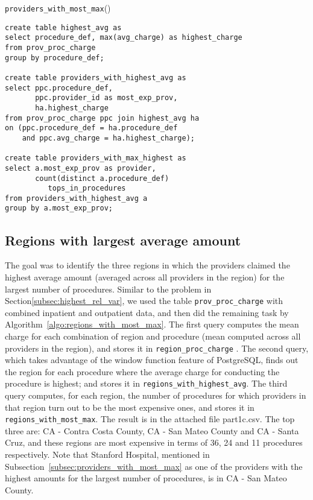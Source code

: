 \begin{algorithm}
\vspace{-2pt}
\caption{{\sf \texttt{providers\_with\_most\_max}}()}
\label{algo:providers_with_most_max}
\begin{verbatim}
create table highest_avg as
select procedure_def, max(avg_charge) as highest_charge
from prov_proc_charge
group by procedure_def;

create table providers_with_highest_avg as
select ppc.procedure_def, 
       ppc.provider_id as most_exp_prov, 
       ha.highest_charge
from prov_proc_charge ppc join highest_avg ha 
on (ppc.procedure_def = ha.procedure_def 
    and ppc.avg_charge = ha.highest_charge);

create table providers_with_max_highest as
select a.most_exp_prov as provider, 
       count(distinct a.procedure_def) 
          tops_in_procedures
from providers_with_highest_avg a
group by a.most_exp_prov;
\end{verbatim}
\end{algorithm}

\subsection{Regions with largest average amount}
\label{subsec:regions_with_most_max}
The goal was to identify the three regions in which the providers claimed the highest average amount (averaged across all providers in the region) for the largest number of procedures. Similar to the problem in Section\ref{subsec:highest_rel_var}, we used the table \texttt{prov\_proc\_charge} with combined inpatient and outpatient data, and then did the remaining task by Algorithm~\ref{algo:regions_with_most_max}. The first query computes the mean charge for each combination of region and procedure (mean computed across all providers in the region), and stores it in \texttt{region\_proc\_charge} . The second query, which takes advantage of the window function feature of PostgreSQL, finds out the region for each procedure where the average charge for conducting the procedure is highest; and stores it in \texttt{regions\_with\_highest\_avg}. The third query computes, for each region, the number of procedures for which providers in that region turn out to be the most expensive ones, and stores it in \texttt{regions\_with\_most\_max}. The result is in the attached file part1c.csv. The top three are: CA - Contra Costa County, CA - San Mateo County and CA - Santa Cruz, and these regions are most expensive in terms of 36, 24 and 11 procedures respectively. Note that Stanford Hospital, mentioned in Subsection~\ref{subsec:providers_with_most_max} as one of the providers with the highest amounts for the largest number of procedures, is in CA - San Mateo County.

